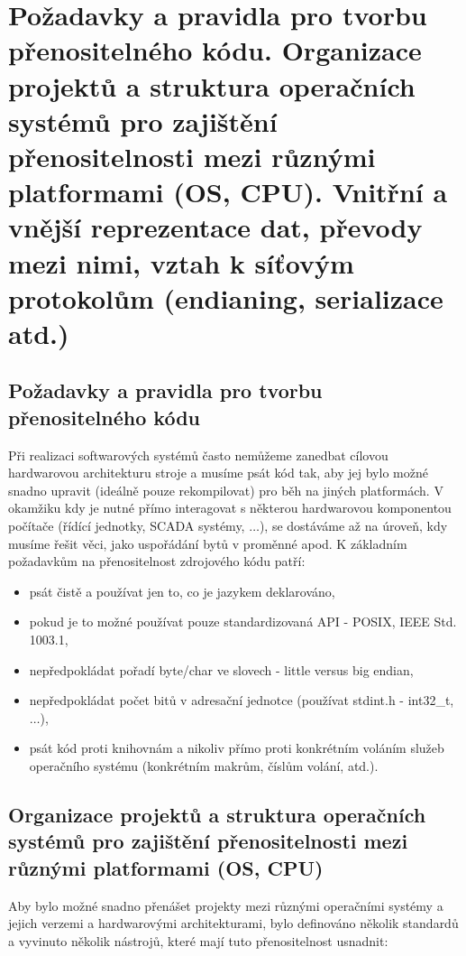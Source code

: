 \section[OSP - Přenositelnost, multiplatformnost]{Požadavky a pravidla pro tvorbu přenositelného kódu. Organizace projektů a struktura operačních systémů pro zajištění přenositelnosti mezi různými platformami (OS, CPU). Vnitřní a vnější reprezentace dat, převody mezi nimi, vztah k síťovým protokolům (endianing, serializace atd.)}

\subsection{Požadavky a pravidla pro tvorbu přenositelného kódu}
Při realizaci softwarových systémů často nemůžeme zanedbat cílovou hardwarovou architekturu stroje a musíme psát kód tak, aby jej bylo možné snadno upravit (ideálně pouze rekompilovat) pro běh na jiných platformách. V okamžiku kdy je nutné přímo interagovat s některou hardwarovou komponentou počítače (řídící jednotky, SCADA systémy, $\hdots$), se dostáváme až na úroveň, kdy musíme řešit věci, jako uspořádání bytů v proměnné apod. K základním požadavkům na přenositelnost zdrojového kódu patří:

\begin{itemize}[itemsep=0px]
\item psát čistě a používat jen to, co je jazykem deklarováno,
\item pokud je to možné používat pouze standardizovaná API - POSIX, IEEE Std. 1003.1,
\item nepředpokládat pořadí byte/char ve slovech - little versus big endian,
\item nepředpokládat počet bitů v adresační jednotce (používat stdint.h - int32\_t, $\hdots$),
\item psát kód proti knihovnám a nikoliv přímo proti konkrétním voláním služeb operačního systému (konkrétním makrům, číslům volání, atd.).
\end{itemize}

\subsection{Organizace projektů a struktura operačních systémů pro zajištění přenositelnosti mezi různými platformami (OS, CPU)}

Aby bylo možné snadno přenášet projekty mezi různými operačními systémy a jejich verzemi a hardwarovými architekturami, bylo definováno několik standardů a vyvinuto několik nástrojů, které mají tuto přenositelnost usnadnit:
